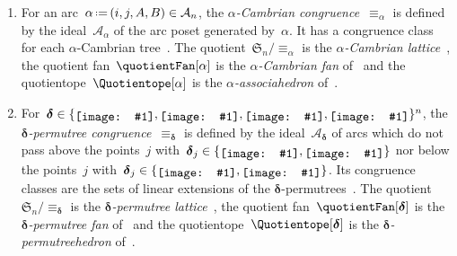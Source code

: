 \documentclass{amsart}
\theoremstyle{definition}
\newcommand{\f}[1]{{\mathfrak{#1}}} %
\renewcommand{\b}[1]{{\boldsymbol{#1}}} %
\newcommand{\eqdef}{\mbox{\,\raisebox{0.2ex}{\scriptsize\ensuremath{\mathrm:}}\ensuremath{=}\,}} %
\newcommand{\darkblue}{\color{darkblue}} %
\newcommand{\defn}[1]{\textsl{\darkblue #1}} %
\newcommand{\arc}{\alpha} %
\newcommand{\arcs}{{\mathcal{A}}} %
\newcommand{\decoration}{{\b{\delta}}} %
\newcommand{\includeSymbol}[1]{\ensuremath{%
	\mathchoice
		{\raisebox{-.7mm}{\texttt{[image: \#1]}}}	
		{\raisebox{-.7mm}{\texttt{[image: \#1]}}}
		{\raisebox{-.6mm}{\texttt{[image: \#1]}}}
		{\raisebox{-.5mm}{\texttt{[image: \#1]}}}
}}
\newcommand{\noneCirc}{\includeSymbol{none}}
\newcommand{\upCirc}{\includeSymbol{up}}
\newcommand{\downCirc}{\includeSymbol{down}}
\newcommand{\upDownCirc}{\includeSymbol{updown}}
\newcommand{\Decorations}{\{\noneCirc{}, \downCirc{}, \upCirc{}, \upDownCirc{}\}} %
\begin{document}
\begin{enumerate}
\item \label{item:CambrianCongruence}
For an arc~$\arc \eqdef (i, j, A, B) \in \arcs_n$, the \defn{$\arc$-Cambrian congruence}~$\equiv_\arc$ is defined by the ideal~$\arcs_\arc$ of the arc poset generated by~$\arc$.
It has a congruence class for each  $\arc$-Cambrian tree~\cite{LangePilaud, ChatelPilaud, PilaudPons-permutrees}.
The quotient~$\f{S}_n / {\equiv_\arc}$ is the \defn{$\arc$-Cambrian lattice}~\cite{Reading-CambrianLattices}, the quotient fan~$\quotientFan[\arc]$ is the \defn{$\arc$-Cambrian fan} of~\cite{ReadingSpeyer} and the quotientope~$\Quotientope[\arc]$ is the \defn{$\arc$-associahedron} of~\cite{HohlwegLange}.

\item \label{item:permutreeCongruence}
For~$\decoration \in \Decorations^n$, the \defn{$\decoration$-permutree congruence}~$\equiv_\decoration$ is defined by the ideal~$\arcs_\decoration$ of arcs which do not pass above the points~$j$ with~$\decoration_j \in \{\upCirc, \upDownCirc\}$ nor below the points~$j$ with~${\decoration_j \in \{\downCirc, \upDownCirc\}}$.
Its congruence classes are the sets of linear extensions of the $\decoration$-permutrees~\cite{PilaudPons-permutrees}.
The quotient~$\f{S}_n / {\equiv_\decoration}$ is the \defn{$\decoration$-permutree lattice}~\cite{PilaudPons-permutrees}, the quotient fan~$\quotientFan[\decoration]$ is the \defn{$\decoration$-permutree fan} of~\cite{PilaudPons-permutrees} and the quotientope~$\Quotientope[\decoration]$ is the \defn{$\decoration$-permutreehedron} of~\cite{PilaudPons-permutrees}.


\end{enumerate}
\end{document}
